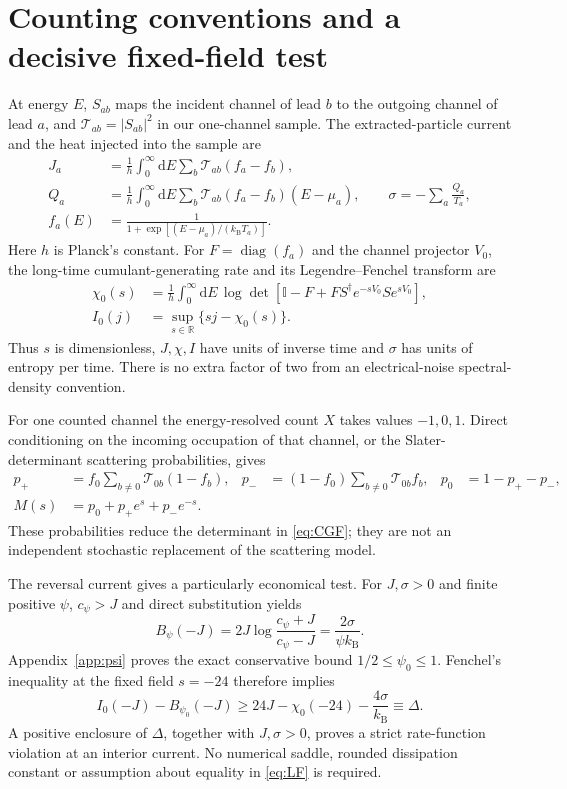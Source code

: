 \documentclass[11pt,a4paper]{article}
\newcommand{\kb}{k_{\mathrm B}}
\newcommand{\dd}{\mathrm d}
\begin{document}
\section{Counting conventions and a decisive fixed-field test}

At energy $E$, $S_{ab}$ maps the incident channel of lead $b$ to the outgoing
channel of lead $a$, and $\mathcal T_{ab}=|S_{ab}|^2$ in our one-channel
sample. The extracted-particle current and the heat injected into the sample
are
\begin{align}
 J_a&=\frac1h\int_0^\infty\!\dd E\sum_b
       \mathcal T_{ab}(f_a-f_b),\label{eq:J}\\
 Q_a&=\frac1h\int_0^\infty\!\dd E\sum_b
       \mathcal T_{ab}(f_a-f_b)(E-\mu_a),\qquad
 \sigma=-\sum_a\frac{Q_a}{T_a},\label{eq:entropy}\\
 f_a(E)&=\frac{1}{1+\exp[(E-\mu_a)/(\kb T_a)]}.
\end{align}
Here $h$ is Planck's constant. For $F=\operatorname{diag}(f_a)$ and the
channel projector $V_0$, the long-time cumulant-generating rate and its
Legendre--Fenchel transform are
\begin{align}
 \chi_0(s)&=\frac1h\int_0^\infty\!\dd E\,
 \log\det[\mathbb I-F+F S^\dagger e^{-sV_0}S e^{sV_0}],\label{eq:CGF}\\
 I_0(j)&=\sup_{s\in\mathbb R}\{sj-\chi_0(s)\}.
 \label{eq:LF}
\end{align}
Thus $s$ is dimensionless, $J,\chi,I$ have units of inverse time and
$\sigma$ has units of entropy per time. There is no extra factor of two
from an electrical-noise spectral-density convention.

For one counted channel the energy-resolved count $X$ takes values
$-1,0,1$. Direct conditioning on the incoming occupation of that channel,
or the Slater-determinant scattering probabilities, gives
\begin{align}
 p_+&=f_0\sum_{b\ne0}\mathcal T_{0b}(1-f_b),&
 p_-&=(1-f_0)\sum_{b\ne0}\mathcal T_{0b}f_b,&
 p_0&=1-p_+-p_-,\label{eq:marginal}\\
 M(s)&=p_0+p_+e^s+p_-e^{-s}.\label{eq:M}
\end{align}
These probabilities reduce the determinant in \eqref{eq:CGF}; they are not
an independent stochastic replacement of the scattering model.

The reversal current gives a particularly economical test. For $J,\sigma>0$
and finite positive $\psi$, $c_\psi>J$ and direct substitution yields
\begin{equation}
 B_\psi(-J)=2J\log\frac{c_\psi+J}{c_\psi-J}
           =\frac{2\sigma}{\psi\kb}.
 \label{eq:reversalB}
\end{equation}
Appendix~\ref{app:psi} proves the exact conservative bound
$1/2\le\psi_0\le1$. Fenchel's inequality at the fixed field $s=-24$
therefore implies
\begin{equation}
 I_0(-J)-B_{\psi_0}(-J)
 \ge24J-\chi_0(-24)-\frac{4\sigma}{\kb}
 \equiv\Delta.
 \label{eq:Delta}
\end{equation}
A positive enclosure of $\Delta$, together with $J,\sigma>0$, proves a
strict rate-function violation at an interior current. No numerical saddle,
rounded dissipation constant or assumption about equality in
\eqref{eq:LF} is required.
\end{document}
